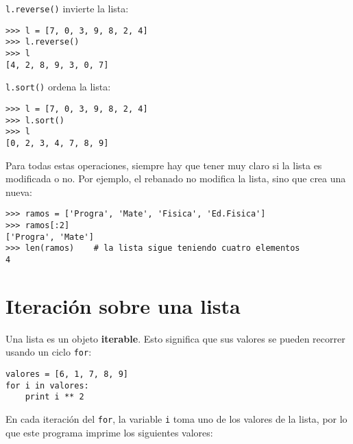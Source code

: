 \lstinline!l.reverse()! invierte la lista:

\begin{lstlisting}
>>> l = [7, 0, 3, 9, 8, 2, 4]
>>> l.reverse()
>>> l
[4, 2, 8, 9, 3, 0, 7]
\end{lstlisting}

\lstinline!l.sort()! ordena la lista:

\begin{lstlisting}
>>> l = [7, 0, 3, 9, 8, 2, 4]
>>> l.sort()
>>> l
[0, 2, 3, 4, 7, 8, 9]
\end{lstlisting}

Para todas estas operaciones, siempre hay que tener muy claro si la
lista es modificada o no. Por ejemplo, el rebanado no modifica la lista,
sino que crea una nueva:

\begin{lstlisting}
>>> ramos = ['Progra', 'Mate', 'Fisica', 'Ed.Fisica']
>>> ramos[:2]
['Progra', 'Mate']
>>> len(ramos)    # la lista sigue teniendo cuatro elementos
4
\end{lstlisting}

\section{Iteración sobre una lista}

Una lista es un objeto \textbf{iterable}. Esto significa que sus valores
se pueden recorrer usando un ciclo \lstinline!for!:

\begin{lstlisting}
valores = [6, 1, 7, 8, 9]
for i in valores:
    print i ** 2
\end{lstlisting}

En cada iteración del \lstinline!for!, la variable \lstinline!i! toma
uno de los valores de la lista, por lo que este programa imprime los
siguientes valores:

